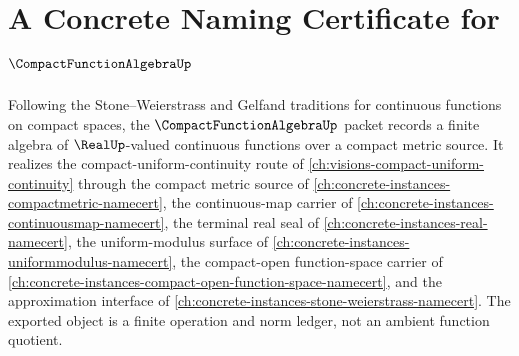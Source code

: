 \chapter{A Concrete Naming Certificate for $\CompactFunctionAlgebraUp$}
\label{ch:concrete-instances-compact-function-algebra-namecert}

Following the Stone--Weierstrass and Gelfand traditions for continuous functions on compact spaces, the $\CompactFunctionAlgebraUp$ packet records a finite algebra of $\RealUp$-valued continuous functions over a compact metric source. It realizes the compact-uniform-continuity route of \autoref{ch:visions-compact-uniform-continuity} through the compact metric source of \autoref{ch:concrete-instances-compactmetric-namecert}, the continuous-map carrier of \autoref{ch:concrete-instances-continuousmap-namecert}, the terminal real seal of \autoref{ch:concrete-instances-real-namecert}, the uniform-modulus surface of \autoref{ch:concrete-instances-uniformmodulus-namecert}, the compact-open function-space carrier of \autoref{ch:concrete-instances-compact-open-function-space-namecert}, and the approximation interface of \autoref{ch:concrete-instances-stone-weierstrass-namecert}. The exported object is a finite operation and norm ledger, not an ambient function quotient.

